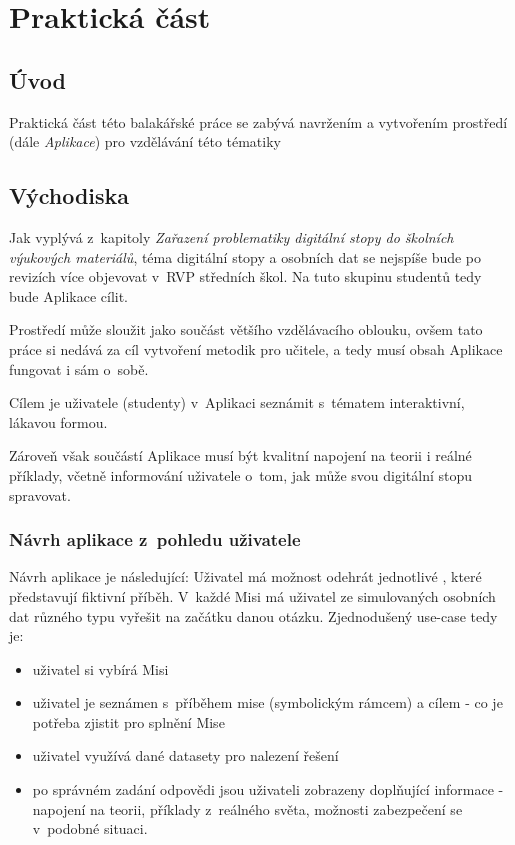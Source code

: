 \chapter{Praktická část}

\section*{Úvod}
Praktická část této balakářské práce se zabývá navržením a vytvořením prostředí (dále \textit{Aplikace}) pro vzdělávání této tématiky

\section{Východiska}
Jak vyplývá z~kapitoly \textit{Zařazení problematiky digitální stopy do školních výukových materiálů}, téma digitální stopy a osobních dat se nejspíše bude po revizích více objevovat v~RVP středních škol. Na tuto skupinu studentů tedy bude Aplikace cílit.

Prostředí může sloužit jako součást většího vzdělávacího oblouku, ovšem tato práce si nedává za cíl vytvoření metodik pro učitele, a tedy musí obsah Aplikace fungovat i sám o~sobě.

Cílem je uživatele (studenty) v~Aplikaci seznámit s~tématem interaktivní, lákavou formou.

Zároveň však součástí Aplikace musí být kvalitní napojení na teorii i reálné příklady, včetně informování uživatele o~tom, jak může svou digitální stopu spravovat.

\subsection{Návrh aplikace z~pohledu uživatele}
Návrh aplikace je následující:
Uživatel má možnost odehrát jednotlivé , které představují fiktivní příběh. V~každé Misi má uživatel ze simulovaných osobních dat různého typu vyřešit na začátku danou otázku.
Zjednodušený use-case tedy je:
\begin{itemize}
	\item uživatel si vybírá Misi
	\item uživatel je seznámen s~příběhem mise (symbolickým rámcem) a cílem - co je potřeba zjistit pro splnění Mise
	\item uživatel využívá dané datasety pro nalezení řešení
	\item po správném zadání odpovědi jsou uživateli zobrazeny doplňující informace - napojení na teorii, příklady z~reálného světa, možnosti zabezpečení se v~podobné situaci.
\end{itemize}

